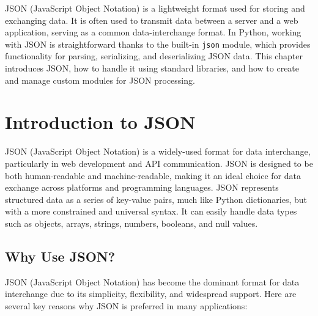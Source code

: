 \documentclass[
  letterpaper,
  DIV=11,
  numbers=noendperiod]{scrreprt}
\begin{document}
JSON (JavaScript Object Notation) is a lightweight format used for
storing and exchanging data. It is often used to transmit data between a
server and a web application, serving as a common data-interchange
format. In Python, working with JSON is straightforward thanks to the
built-in \texttt{json} module, which provides functionality for parsing,
serializing, and deserializing JSON data. This chapter introduces JSON,
how to handle it using standard libraries, and how to create and manage
custom modules for JSON processing.

\hypertarget{introduction-to-json}{%
\section{Introduction to JSON}\label{introduction-to-json}}

JSON (JavaScript Object Notation) is a widely-used format for data
interchange, particularly in web development and API communication. JSON
is designed to be both human-readable and machine-readable, making it an
ideal choice for data exchange across platforms and programming
languages. JSON represents structured data as a series of key-value
pairs, much like Python dictionaries, but with a more constrained and
universal syntax. It can easily handle data types such as objects,
arrays, strings, numbers, booleans, and null values.

\hypertarget{why-use-json}{%
\subsection{Why Use JSON?}\label{why-use-json}}

JSON (JavaScript Object Notation) has become the dominant format for
data interchange due to its simplicity, flexibility, and widespread
support. Here are several key reasons why JSON is preferred in many
applications:
\end{document}
